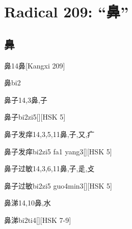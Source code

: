 \section*{Radical 209: ``⿐''}

\subsection*{鼻}

\begin{Entry}{鼻}{14}{⿐}[Kangxi 209]
  \begin{Phonetics}{鼻}{bi2}
  \end{Phonetics}
\end{Entry}

\begin{Entry}{鼻子}{14,3}{⿐,⼦}
  \begin{Phonetics}{鼻子}{bi2zi5}[][HSK 5]
  \end{Phonetics}
\end{Entry}

\begin{Entry}{鼻子发痒}{14,3,5,11}{⿐,⼦,⼜,⽧}
  \begin{Phonetics}{鼻子发痒}{bi2zi5 fa1 yang3}[][HSK 5]
  \end{Phonetics}
\end{Entry}

\begin{Entry}{鼻子过敏}{14,3,6,11}{⿐,⼦,⾡,⽁}
  \begin{Phonetics}{鼻子过敏}{bi2zi5 guo4min3}[][HSK 5]
  \end{Phonetics}
\end{Entry}

\begin{Entry}{鼻涕}{14,10}{⿐,⽔}
  \begin{Phonetics}{鼻涕}{bi2ti4}[][HSK 7-9]
  \end{Phonetics}
\end{Entry}


